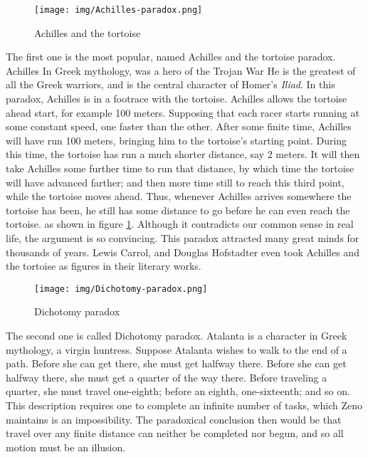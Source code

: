 \documentclass{article}
\begin{document}
\begin{figure}[htbp]
 \centering
 \texttt{[image: img/Achilles-paradox.png]}
 \caption{Achilles and the tortoise}
 \label{fig:Achilles-paradox}
\end{figure}

The first one is the most popular, named Achilles and the tortoise paradox. Achilles In Greek mythology, was a hero of the Trojan War He is the greatest of all the Greek warriors, and is the central character of Homer's {\em Iliad}. In this paradox, Achilles is in a footrace with the tortoise. Achilles allows the tortoise ahead start, for example 100 meters. Supposing that each racer starts running at some constant speed, one faster than the other. After some finite time, Achilles will have run 100 meters, bringing him to the tortoise's starting point. During this time, the tortoise has run a much shorter distance, say 2 meters. It will then take Achilles some further time to run that distance, by which time the tortoise will have advanced farther; and then more time still to reach this third point, while the tortoise moves ahead. Thus, whenever Achilles arrives somewhere the tortoise has been, he still has some distance to go before he can even reach the tortoise. as shown in figure \ref{fig:Achilles-paradox}. Although it contradicts our common sense in real life, the argument is so convincing. This paradox attracted many great minds for thousands of years. Lewis Carrol, and Douglas Hofstadter even took Achilles and the tortoise as figures in their literary works.

\begin{figure}[htbp]
 \centering
 \texttt{[image: img/Dichotomy-paradox.png]}
 \caption{Dichotomy paradox}
 \label{fig:Dichotomy-paradox}
\end{figure}

The second one is called Dichotomy paradox. Atalanta is a character in Greek mythology, a virgin huntress. Suppose Atalanta wishes to walk to the end of a path. Before she can get there, she must get halfway there. Before she can get halfway there, she must get a quarter of the way there. Before traveling a quarter, she must travel one-eighth; before an eighth, one-sixteenth; and so on. This description requires one to complete an infinite number of tasks, which Zeno maintains is an impossibility. The paradoxical conclusion then would be that travel over any finite distance can neither be completed nor begun, and so all motion must be an illusion.
\end{document}
